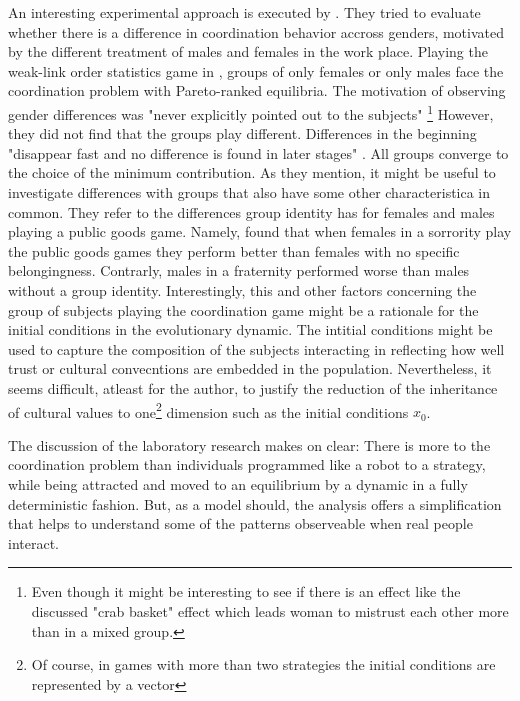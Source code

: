 \documentclass[11pt]{article}
\begin{document}
An interesting experimental approach is executed by 
\textcite{dufwenberg_gender_2005}. They tried to evaluate whether 
there is a difference in coordination behavior accross genders, motivated by 
the different treatment of males and females in the work place. Playing the 
weak-link order statistics game in \cite{van_huyck_tacit_1990}, groups of 
only females or only males face the coordination problem with Pareto-ranked 
equilibria. The motivation of observing gender differences was 
"never explicitly pointed  out to the subjects" 
\parencite{dufwenberg_gender_2005}\footnote{
Even though it might be interesting to see if there is an effect like 
the discussed "crab basket" effect which leads woman to mistrust each other 
more than in a mixed group.} However, they did not find that the groups play
different. Differences in the beginning "disappear fast and no difference
is found in later stages" \parencite[235]{dufwenberg_gender_2005}. 
All groups converge to the choice of the minimum
contribution. As they mention, it might be useful to investigate differences
with groups that also have some other characteristica in common. They refer
to the differences group identity has for females and males playing a 
public goods game. Namely, \textcite{croson_groups_2008} found that when
females in a sorrority play the public goods games they perform better than 
females with no specific belongingness. Contrarly, males in a fraternity 
performed worse than males without a group identity. 
Interestingly, this and other factors concerning the group of subjects 
playing the coordination game might be a rationale for the initial conditions
in the evolutionary dynamic. The intitial conditions might be used to 
capture the composition of the subjects interacting in reflecting how well
trust or cultural convecntions are embedded in the population. 
Nevertheless, it seems difficult, atleast for the author, to justify
the reduction of the inheritance of cultural values to one\footnote{Of course, 
in games with more than two strategies the initial conditions are represented 
by a vector} dimension such as the initial conditions $x_0$.

The discussion of the laboratory research makes on clear: There is more
to the coordination problem than individuals programmed like a robot 
to a strategy, while being attracted and moved to an equilibrium by a dynamic
in a fully deterministic fashion. But, as a model should, the analysis offers 
a simplification that helps to understand some of the patterns observeable 
when real people interact. 
\end{document}
